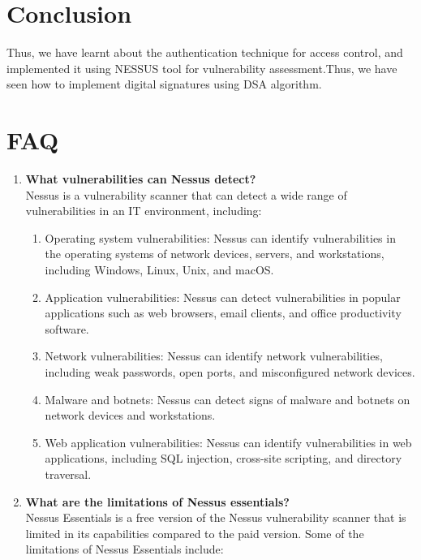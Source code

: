 \documentclass[11pt]{article}
\begin{document}
\section{Conclusion}
Thus, we have learnt about the authentication technique for access control, and implemented it using NESSUS tool for vulnerability assessment.Thus, we have seen how to implement digital signatures using DSA algorithm.
\clearpage

\section{FAQ}

\begin{enumerate}

    \item \textbf{What vulnerabilities can Nessus detect?}\\

          Nessus is a vulnerability scanner that can detect a wide range of vulnerabilities in an IT environment, including:

          \begin{enumerate}
              \item Operating system vulnerabilities: Nessus can identify vulnerabilities in the operating systems of network devices, servers, and workstations, including Windows, Linux, Unix, and macOS.
              \item Application vulnerabilities: Nessus can detect vulnerabilities in popular applications such as web browsers, email clients, and office productivity software.
              \item Network vulnerabilities: Nessus can identify network vulnerabilities, including weak passwords, open ports, and misconfigured network devices.
              \item Malware and botnets: Nessus can detect signs of malware and botnets on network devices and workstations.
              \item Web application vulnerabilities: Nessus can identify vulnerabilities in web applications, including SQL injection, cross-site scripting, and directory traversal.
          \end{enumerate}
    \item \textbf{What are the limitations of Nessus essentials?}\\

          Nessus Essentials is a free version of the Nessus vulnerability scanner that is limited in its capabilities compared to the paid version. Some of the limitations of Nessus Essentials include:


\end{enumerate}
\end{document}
